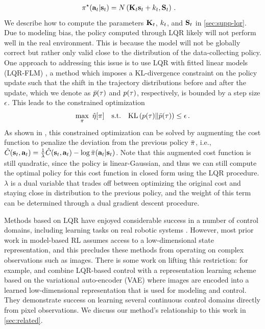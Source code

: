 \begin{align*}
    &\pi^\star(\mathbf{a}_t|\mathbf{s}_t)=N\left(\mathbf{K}_t\mathbf{s}_t+k_t,\mathbf{S}_t\right)\,.
\end{align*}
We describe how to compute the parameters $\mathbf{K}_t$, $k_t$, and $\mathbf{S}_t$ in \autoref{sec:supp-lqr}. Due to modeling bias, the policy computed through LQR likely will not perform well in the real environment. This is because the model will not be globally correct but rather only valid close to the distribution of the data-collecting policy. One approach to addressing this issue is to use LQR with fitted linear models \mbox{(LQR-FLM)} \citep{mfcgps}, a method which imposes a KL-divergence constraint on the policy update such that the shift in the trajectory distributions before and after the update, which we denote as $\bar{p}(\tau)$ and $p(\tau)$, respectively, is bounded by a step size $\epsilon$. This leads to the constrained optimization
\begin{align}
  \max_\policy~\hat{\policyobj}[\policy]\text{\ \ \ s.t.\ \ \ }\KL{\p(\traj)}{\bar{p}(\traj)}\leq\polstepsize\,.\label{eq:lqrflm}
\end{align}
As shown in \citet{mfcgps}, this constrained optimization can be solved by augmenting the cost function to penalize the deviation from the previous policy $\bar{\pi}$, i.e., $\tilde{C}(\mathbf{s}_t,\mathbf{a}_t)=\frac{1}{\lambda}\hat{C}(\mathbf{s}_t,\mathbf{a}_t)-\log\bar{\pi}(\mathbf{a}_t|\mathbf{s}_t)$. Note that this augmented cost function is still quadratic, since the policy is linear-Gaussian, and thus we can still compute the optimal policy for this cost function in closed form using the LQR procedure. $\lambda$ is a dual variable that trades off between optimizing the original cost and staying close in distribution to the previous policy, and the weight of this term can be determined through a dual gradient descent procedure.

Methods based on LQR have enjoyed considerable success in a number of control domains, including learning tasks on real robotic systems \citep{ilqg,gps}. However, most prior work in model-based RL assumes access to a low-dimensional state representation, and this precludes these methods from operating on complex observations such as images. There is some work on lifting this restriction: for example, \citet{e2c} and \citet{rce} combine LQR-based control with a representation learning scheme based on the variational auto-encoder (VAE) \citep{vae-kingma,vae-rezende} where images are encoded into a learned low-dimensional representation that is used for modeling and control. They demonstrate success on learning several continuous control domains directly from pixel observations. We discuss our method's relationship to this work in \autoref{sec:related}.


